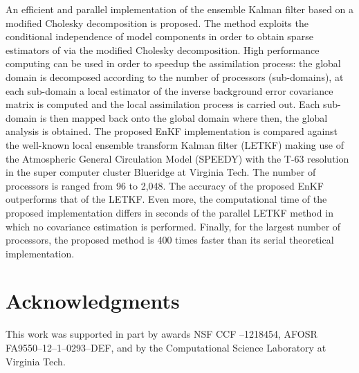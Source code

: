 \documentclass[12pt]{article}
\begin{document}
An efficient and parallel implementation of the ensemble Kalman filter based on a modified Cholesky decomposition is proposed. The method exploits the conditional independence of model components in order to obtain sparse estimators of  via the modified Cholesky decomposition. High performance computing can be used in order to speedup the assimilation process: the global domain is decomposed according to the number of processors (sub-domains), at each sub-domain a local estimator of the inverse background error covariance matrix is computed and the local assimilation process is carried out. Each sub-domain is then mapped back onto the global domain where then, the global analysis is obtained. The proposed EnKF implementation is compared against the well-known local ensemble transform Kalman filter (LETKF) making use of the Atmospheric General Circulation Model (SPEEDY) with the T-63 resolution in the super computer cluster Blueridge at Virginia Tech. The number of processors is ranged from 96 to 2,048. The accuracy of the proposed EnKF outperforms that of the LETKF. Even more, the computational time of the proposed implementation differs in seconds of the parallel LETKF method in which no covariance estimation is performed. Finally, for the largest number of processors, the proposed method is 400 times faster than its serial theoretical implementation.



\section{Acknowledgments}

This work was supported in part by awards
NSF CCF --1218454,
AFOSR FA9550--12--1--0293--DEF,
and by the Computational Science Laboratory at Virginia Tech.
\end{document}
